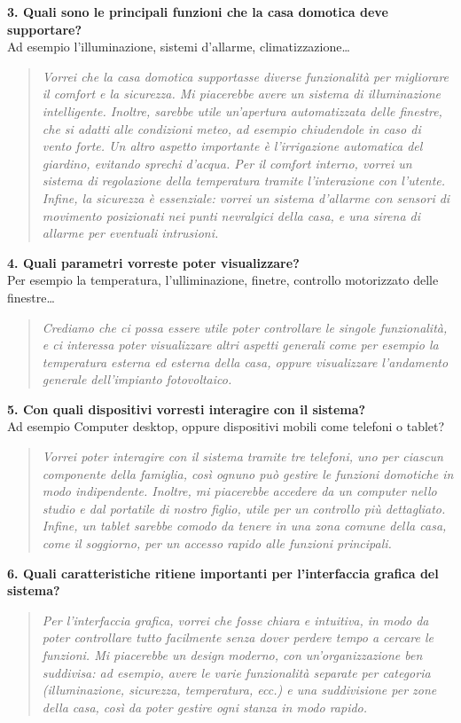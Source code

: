 \documentclass{exam}
\begin{document}
\clearpage
\noindent\textbf{3. Quali sono le principali funzioni che la casa domotica deve supportare?}\\[1.5mm]
Ad esempio l'illuminazione, sistemi d'allarme, climatizzazione\ldots\\[1.5mm]
\begin{quote}
\emph{Vorrei che la casa domotica supportasse diverse funzionalità per migliorare il comfort e la sicurezza. Mi piacerebbe avere un sistema di illuminazione intelligente. Inoltre, sarebbe utile un’apertura automatizzata delle finestre, che si adatti alle condizioni meteo, ad esempio chiudendole in caso di vento forte.
Un altro aspetto importante è l’irrigazione automatica del giardino, evitando sprechi d’acqua. Per il comfort interno, vorrei un sistema di regolazione della temperatura tramite l'interazione con l'utente. Infine, la sicurezza è essenziale: vorrei un sistema d’allarme con sensori di movimento posizionati nei punti nevralgici della casa, e una sirena di allarme per eventuali intrusioni.}\\
\end{quote}

\clearpage
\noindent\textbf{4. Quali parametri vorreste poter visualizzare?}\\[1.5mm]
Per esempio la temperatura, l'ulliminazione, finetre, controllo motorizzato delle finestre\ldots
\begin{quote}
    \emph{Crediamo che ci possa essere utile poter controllare le singole funzionalità, e ci interessa poter visualizzare altri aspetti generali come per esempio la temperatura esterna ed esterna della casa, oppure visualizzare l'andamento generale dell'impianto fotovoltaico.}
\end{quote}
\clearpage
\noindent\textbf{5. Con quali dispositivi vorresti interagire con il sistema?}\\[1mm]
Ad esempio Computer desktop, oppure dispositivi mobili come telefoni o tablet?\\[1.5mm]
\begin{quote}
\emph{Vorrei poter interagire con il sistema tramite tre telefoni, uno per ciascun componente della famiglia, così ognuno può gestire le funzioni domotiche in modo indipendente. Inoltre, mi piacerebbe accedere da un computer nello studio e dal portatile di nostro figlio, utile per un controllo più dettagliato. Infine, un tablet sarebbe comodo da tenere in una zona comune della casa, come il soggiorno, per un accesso rapido alle funzioni principali.}\\
\end{quote}
\clearpage
\noindent\textbf{6. Quali caratteristiche ritiene importanti per l’interfaccia grafica del sistema?}\\[1.5mm]
\begin{quote}
\emph{Per l’interfaccia grafica, vorrei che fosse chiara e intuitiva, in modo da poter controllare tutto facilmente senza dover perdere tempo a cercare le funzioni. Mi piacerebbe un design moderno, con un’organizzazione ben suddivisa: ad esempio, avere le varie funzionalità separate per categoria (illuminazione, sicurezza, temperatura, ecc.) e una suddivisione per zone della casa, così da poter gestire ogni stanza in modo rapido.}
\end{quote}
\end{document}
